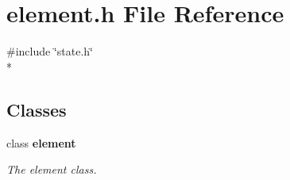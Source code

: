 \section{element.\-h File Reference}
\label{element_8h}
{\ttfamily \#include \char`\"{}state.\-h\char`\"{}}\\*
\subsection*{Classes}
\begin{DoxyCompactItemize}
\item 
class {\bf element}
\begin{DoxyCompactList}\small\item\em The element class. \end{DoxyCompactList}\end{DoxyCompactItemize}
